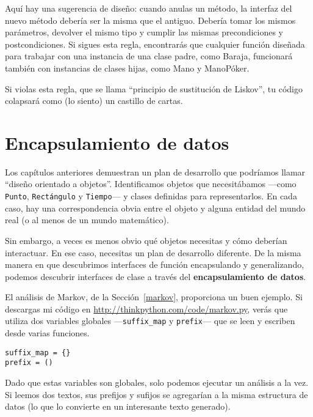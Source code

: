 \documentclass[10pt]{book}
\begin{document}
Aquí hay una sugerencia de diseño: cuando anulas un método,
la interfaz del nuevo método debería ser la misma que el antiguo.  Debería
tomar los mismos parámetros, devolver el mismo tipo y cumplir las
mismas precondiciones y postcondiciones.  Si sigues esta regla,
encontrarás que cualquier función diseñada para trabajar con una instancia de una
clase padre, como Baraja, funcionará también con instancias de
clases hijas, como Mano y ManoPóker.

Si violas esta regla, que se llama ``principio de sustitución
de Liskov'', tu código colapsará como (lo siento) un castillo de cartas.


\section{Encapsulamiento de datos}

Los capítulos anteriores demuestran un plan de desarrollo que podríamos llamar
``diseño orientado a objetos''.  Identificamos objetos que necesitábamos ---como
{\tt Punto}, {\tt Rectángulo} y {\tt Tiempo}--- y clases definidas para
representarlos.  En cada caso, hay una correspondencia obvia
entre el objeto y alguna entidad del mundo real (o al menos de un
mundo matemático).

Sin embargo, a veces es menos obvio qué objetos necesitas
y cómo deberían interactuar.  En ese caso, necesitas un plan de desarrollo
diferente.  De la misma manera en que descubrimos interfaces
de función encapsulando y generalizando, podemos descubrir
interfaces de clase a través del {\bf encapsulamiento de datos}.

El análisis de Markov, de la Sección~\ref{markov}, proporciona un buen ejemplo.
Si descargas mi código en \url{http://thinkpython.com/code/markov.py},
verás que utiliza dos variables globales ---\verb"suffix_map" y
\verb"prefix"--- que se leen y escriben desde varias funciones.

\begin{verbatim}
suffix_map = {}
prefix = ()
\end{verbatim}

Dado que estas variables son globales, solo podemos ejecutar un análisis a la
vez.  Si leemos dos textos, sus prefijos y sufijos se
agregarían a la misma estructura de datos (lo que lo convierte en un interesante
texto generado).
\end{document}
